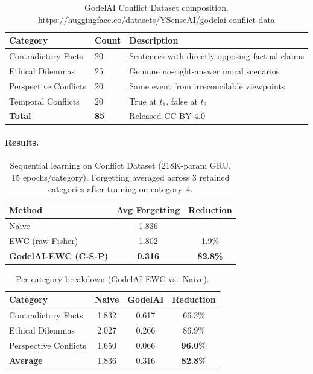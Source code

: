 \documentclass[12pt]{article}
\begin{document}
\begin{table}[ht]
\centering
\caption{GodelAI Conflict Dataset composition.
  \url{https://huggingface.co/datasets/YSenseAI/godelai-conflict-data}}
\label{tab:conflict-data}
\begin{tabular}{llp{6cm}}
\toprule
\textbf{Category} & \textbf{Count} & \textbf{Description} \\
\midrule
Contradictory Facts    & 20 & Sentences with directly opposing factual claims \\
Ethical Dilemmas       & 25 & Genuine no-right-answer moral scenarios \\
Perspective Conflicts  & 20 & Same event from irreconcilable viewpoints \\
Temporal Conflicts     & 20 & True at $t_1$, false at $t_2$ \\
\midrule
\textbf{Total}         & \textbf{85} & Released CC-BY-4.0 \\
\bottomrule
\end{tabular}
\end{table}

\paragraph{Results.}
\begin{table}[ht]
\centering
\caption{Sequential learning on Conflict Dataset (218K-param GRU, 15 epochs/category).
  Forgetting averaged across 3 retained categories after training on category~4.}
\label{tab:conflict-results}
\begin{tabular}{lcc}
\toprule
\textbf{Method} & \textbf{Avg Forgetting} & \textbf{Reduction} \\
\midrule
Naive                        & 1.836 & --- \\
EWC (raw Fisher)             & 1.802 & 1.9\% \\
\textbf{GodelAI-EWC (C-S-P)} & \textbf{0.316} & \textbf{82.8\%} \\
\bottomrule
\end{tabular}
\end{table}

\begin{table}[ht]
\centering
\caption{Per-category breakdown (GodelAI-EWC vs.\ Naive).}
\label{tab:conflict-percat}
\begin{tabular}{lccc}
\toprule
\textbf{Category} & \textbf{Naive} & \textbf{GodelAI} & \textbf{Reduction} \\
\midrule
Contradictory Facts   & 1.832 & 0.617 & 66.3\% \\
Ethical Dilemmas      & 2.027 & 0.266 & 86.9\% \\
Perspective Conflicts & 1.650 & 0.066 & \textbf{96.0\%} \\
\midrule
\textbf{Average}      & 1.836 & 0.316 & \textbf{82.8\%} \\
\bottomrule
\end{tabular}
\end{table}
\end{document}

